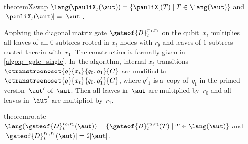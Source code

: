 \vspace{-1mm}
\begin{restatable}{theorem}{Xswap}\label{thm:xswap}
$\lang( \pauliX_t(\aut) )  = \{\pauliX_t(T) \mid  T\in \lang(\aut) \}$ and $|\pauliX_t(\aut)|=|\aut|$.
\end{restatable}
\vspace{-1mm}

\algPGateSimple

Applying the diagonal matrix gate $\gateof{D}^{r_0,r_1}_t$ on the qubit~$x_t$
multiplies all leaves of all $0$-subtrees rooted in $x_t$ nodes with $r_0$ and
leaves of $1$-subtrees rooted therein with~$r_1$. 
The construction is formally given in \cref{algo:p_gate_single}.
In~the algorithm, internal $x_t$-transitions $\ctranstreenoset {q} {x_t} {q_0,
q_1}{C}$ are modified to $\ctranstreenoset {q} {x_t} {q_0, q'_1}{C}$, where
$q'_1$ is a~copy of~$q_1$ in the primed version~$\aut'$ of~$\aut$.
Then all leaves in~$\aut$ are multiplied by~$r_0$ and all leaves in~$\aut'$ are
multiplied by~$r_1$.




\begin{restatable}{theorem}{rotate}\label{thm:rotate}
$\lang( \gateof{D}^{r_0,r_1}_t(\aut) )  = \{\gateof{D}^{r_0,r_1}_t(T) \mid
 T\in \lang(\aut) \}$ and $|\gateof{D}^{r_0,r_1}_t(\aut)|=2|\aut|$.
\end{restatable}

\vspace{-3mm}






